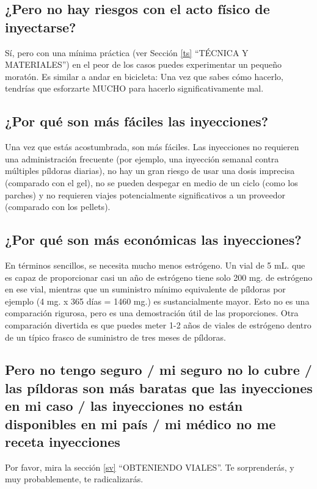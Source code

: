 \documentclass{article}
\begin{document}
\subsection{¿Pero no hay riesgos con el acto físico de inyectarse?}

Sí, pero con una mínima práctica (ver Sección \ref{ts} “TÉCNICA Y MATERIALES”) en el peor de los casos puedes experimentar un pequeño moratón. Es similar a andar en bicicleta: Una vez que sabes cómo hacerlo, tendrías que esforzarte MUCHO para hacerlo significativamente mal.

\subsection{¿Por qué son más fáciles las inyecciones?}

Una vez que estás acostumbrada, son más fáciles. Las inyecciones no requieren una administración frecuente (por ejemplo, una inyección semanal contra múltiples píldoras diarias), no hay un gran riesgo de usar una dosis imprecisa (comparado con el gel), no se pueden despegar en medio de un ciclo (como los parches) y no requieren viajes potencialmente significativos a un proveedor (comparado con los pellets).

\subsection{¿Por qué son más económicas las inyecciones?}

En términos sencillos, se necesita mucho menos estrógeno. Un vial de 5 mL. que es capaz de proporcionar casi un año de estrógeno tiene solo 200 mg. de estrógeno en ese vial, mientras que un suministro mínimo equivalente de píldoras por ejemplo (4 mg. x 365 días = 1460 mg.) es sustancialmente mayor. Esto no es una comparación rigurosa, pero es una demostración útil de las proporciones. Otra comparación divertida es que puedes meter 1-2 años de viales de estrógeno dentro de un típico frasco de suministro de tres meses de píldoras.

\subsection{Pero no tengo seguro / mi seguro no lo cubre / las píldoras son más baratas que las inyecciones en mi caso / las inyecciones no están disponibles en mi país / mi médico no me receta inyecciones}

Por favor, mira la sección \ref{sv} “OBTENIENDO VIALES”. Te sorprenderás, y muy probablemente, te radicalizarás.
\end{document}
